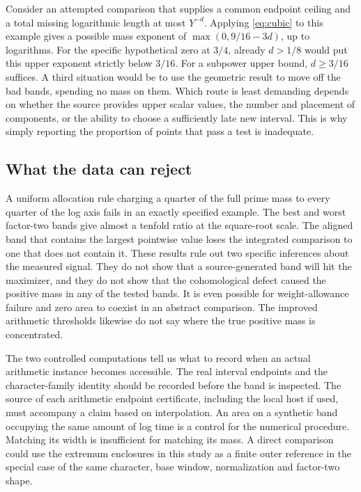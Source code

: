 \documentclass[12pt,letterpaper]{article}
\begin{document}
Consider an attempted comparison that supplies a common endpoint ceiling and a total missing logarithmic length at most \(Y^{-d}\). Applying \eqref{eq:cubic} to this example gives a possible mass exponent of \(\max(0,9/16-3d)\), up to logarithms. For the specific hypothetical zero at \(3/4\), already \(d>1/8\) would put this upper exponent strictly below \(3/16\). For a subpower upper bound, \(d\ge3/16\) suffices. A third situation would be to use the geometric result to move off the bad bands, spending no mass on them. Which route is least demanding depends on whether the source provides upper scalar values, the number and placement of components, or the ability to choose a sufficiently late new interval. This is why simply reporting the proportion of points that pass a test is inadequate.

\subsection{What the data can reject}
A uniform allocation rule charging a quarter of the full prime mass to every quarter of the log axis fails in an exactly specified example. The best and worst factor-two bands give almost a tenfold ratio at the square-root scale. The aligned band that contains the largest pointwise value loses the integrated comparison to one that does not contain it. These results rule out two specific inferences about the measured signal. They do not show that a source-generated band will hit the maximizer, and they do not show that the cohomological defect caused the positive mass in any of the tested bands. It is even possible for weight-allowance failure and zero area to coexist in an abstract comparison. The improved arithmetic thresholds likewise do not say where the true positive mass is concentrated.

The two controlled computations tell us what to record when an actual arithmetic instance becomes accessible. The real interval endpoints and the character-family identity should be recorded before the band is inspected. The source of each arithmetic endpoint certificate, including the local host if used, must accompany a claim based on interpolation. An area on a synthetic band occupying the same amount of log time is a control for the numerical procedure. Matching its width is insufficient for matching its mass. A direct comparison could use the extremum enclosures in this study as a finite outer reference in the special case of the same character, base window, normalization and factor-two shape.
\end{document}
